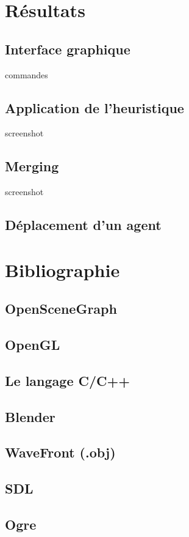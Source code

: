 \documentclass[a4paper,12pt]{report}
\begin{document}
\chapter{Résultats}

\section{Interface graphique}
commandes

\section{Application de l'heuristique}
screenshot

\section{Merging}
screenshot

\section{Déplacement d'un agent}



\chapter{Bibliographie}

\section*{OpenSceneGraph}
\section*{OpenGL}
\section*{Le langage C/C++}
\section*{Blender}
\section*{WaveFront (.obj)}
\section*{SDL}
\section*{Ogre}
\end{document}
